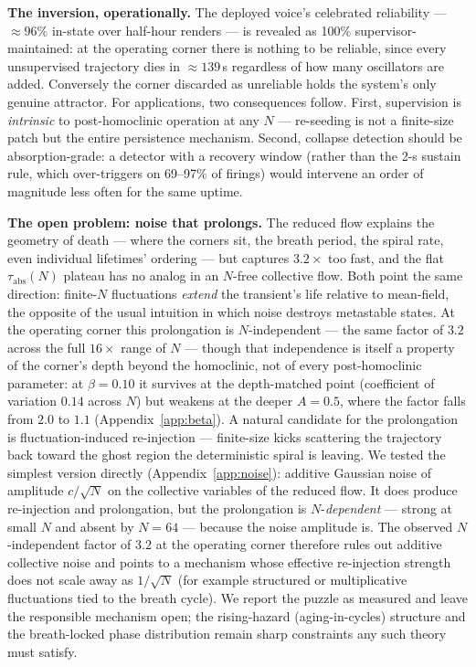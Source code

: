 \documentclass[aip,preprint,amsmath,amssymb]{revtex4-2}
\begin{document}
\textbf{The inversion, operationally.} The deployed voice's celebrated reliability
--- $\approx 96\%$ in-state over half-hour renders --- is revealed as 100\%
supervisor-maintained: at the operating corner there is nothing to be reliable,
since every unsupervised trajectory dies in $\approx 139$\,s regardless of how many
oscillators are added. Conversely the corner discarded as unreliable holds the
system's only genuine attractor. For applications, two consequences follow. First,
supervision is \emph{intrinsic} to post-homoclinic operation at any $N$ ---
re-seeding is not a finite-size patch but the entire persistence mechanism. Second,
collapse detection should be absorption-grade: a detector with a recovery window
(rather than the 2-s sustain rule, which over-triggers on 69--97\% of firings)
would intervene an order of magnitude less often for the same uptime.

\textbf{The open problem: noise that prolongs.} The reduced flow explains the
geometry of death --- where the corners sit, the breath period, the spiral rate,
even individual lifetimes' ordering --- but captures $3.2\times$ too fast, and the
flat $\tau_{\mathrm{abs}}(N)$ plateau has no analog in an $N$-free collective flow.
Both point the same direction: finite-$N$ fluctuations \emph{extend} the transient's
life relative to mean-field, the opposite of the usual intuition in which noise
destroys metastable states. At the operating corner this prolongation is $N$-independent --- the same factor of
$3.2$ across the full $16\times$ range of $N$ --- though that independence is itself
a property of the corner's depth beyond the homoclinic, not of every post-homoclinic
parameter: at $\beta = 0.10$ it survives at the depth-matched point (coefficient of
variation $0.14$ across $N$) but weakens at the deeper $A = 0.5$, where the factor
falls from $2.0$ to $1.1$ (Appendix~\ref{app:beta}). A natural candidate for the
prolongation is fluctuation-induced re-injection --- finite-size kicks scattering the
trajectory back toward the ghost region the deterministic spiral is leaving. We
tested the simplest version directly (Appendix~\ref{app:noise}): additive Gaussian
noise of amplitude $c/\sqrt N$ on the collective variables of the reduced flow. It
does produce re-injection and prolongation, but the prolongation is
$N$-\emph{dependent} --- strong at small $N$ and absent by $N = 64$ --- because the
noise amplitude is. The observed $N$-independent factor of $3.2$ at the operating
corner therefore rules out additive collective noise and points to a mechanism whose
effective re-injection strength does not scale away as $1/\sqrt N$ (for example
structured or multiplicative fluctuations tied to the breath cycle). We report the
puzzle as measured and leave the responsible mechanism open; the rising-hazard
(aging-in-cycles) structure and the breath-locked phase distribution remain sharp
constraints any such theory must satisfy.
\end{document}
